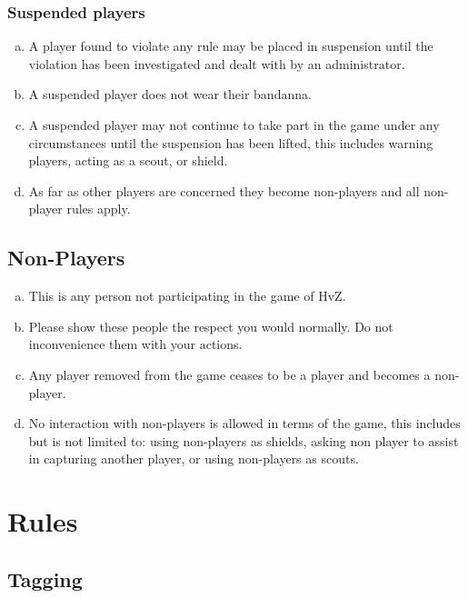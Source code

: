 \documentclass[a4paper,12pt]{article}
\begin{document}
\subsubsection{Suspended players}

\begin{enumerate}[(a)]
    \item A player found to violate any rule may be placed in suspension until the violation has been investigated and dealt with by an administrator.
    \item A suspended player does not wear their bandanna.
    \item A suspended player may not continue to take part in the game under any circumstances until the suspension has been lifted, this includes warning players, acting as a scout, or shield.
    \item As far as other players are concerned they become non-players and all non-player rules apply.
\end{enumerate}


\subsection{Non-Players}
\begin{enumerate}[(a)]
    \item This is any person not participating in the game of HvZ.
    \item Please show these people the respect you would normally. Do not inconvenience them with your actions.
    \item Any player removed from the game ceases to be a player and becomes a non-player. 
    \item No interaction with non-players is allowed in terms of the game, this includes but is not limited to: using non-players as shields, asking non player to assist in capturing another player, or using non-players  as scouts.
\end{enumerate}
\section{Rules}

\subsection{Tagging}
\end{document}
